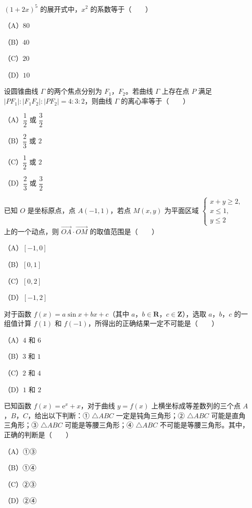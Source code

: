 \begin{question}
$(1+2x)^5$ 的展开式中，$x^2$ 的系数等于\mbox{（　　）}

（A）$80$

（B）$40$

（C）$20$

（D）$10$

\end{question}
\begin{question}
设圆锥曲线 $\Gamma$ 的两个焦点分别为 $F_1$，$F_2$。若曲线 $\Gamma$ 上存在点 $P$ 满足 $|PF_1|:|F_1F_2|:|PF_2|=4:3:2$，则曲线 $\Gamma$ 的离心率等于\mbox{（　　）}

（A）$\dfrac12$ 或 $\dfrac32$

（B）$\dfrac23$ 或 $2$

（C）$\dfrac12$ 或 $2$

（D）$\dfrac23$ 或 $\dfrac32$

\end{question}
\begin{question}
已知 $O$ 是坐标原点，点 $A(-1,1)$，若点 $M(x,y)$ 为平面区域 $\begin{cases}x+y\geqslant2,\\x\leqslant1,\\y\leqslant2\end{cases}$ 上的一个动点，则 $\overrightarrow{OA}\cdot\overrightarrow{OM}$ 的取值范围是\mbox{（　　）}

（A）$[-1,0]$

（B）$[0,1]$

（C）$[0,2]$

（D）$[-1,2]$

\end{question}
\begin{question}
对于函数 $f(x)=a\sin x+bx+c$（其中 $a$，$b\in\mathbf R$，$c\in\mathbf Z$），选取 $a$，$b$，$c$ 的一组值计算 $f(1)$ 和 $f(-1)$，所得出的正确结果一定不可能是\mbox{（　　）}

（A）$4$ 和 $6$

（B）$3$ 和 $1$

（C）$2$ 和 $4$

（D）$1$ 和 $2$

\end{question}
\begin{question}
已知函数 $f(x)=\mathrm e^x+x$，对于曲线 $y=f(x)$ 上横坐标成等差数列的三个点 $A$，$B$，$C$，给出以下判断：① $\triangle ABC$ 一定是钝角三角形；② $\triangle ABC$ 可能是直角三角形；③ $\triangle ABC$ 可能是等腰三角形；④ $\triangle ABC$ 不可能是等腰三角形。其中，正确的判断是\mbox{（　　）}

（A）①③

（B）①④

（C）②③

（D）②④

\end{question}

